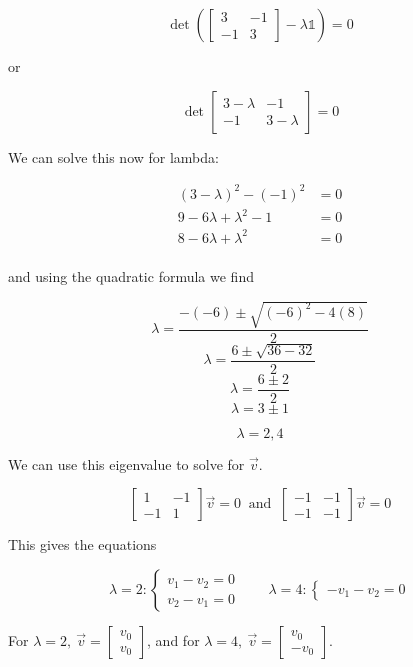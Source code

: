 \documentclass{article}
\begin{document}
$$ \det\left(\begin{bmatrix}
3 	&	-1	\\
-1	&	3	\end{bmatrix} - \lambda\mathbb{1}\right) = 0 $$

or 

$$ \det\begin{bmatrix}
3-\lambda	&	-1	\\
-1	&	3-\lambda	\end{bmatrix} = 0 $$

We can solve this now for lambda:


\begin{align*}
(3-\lambda)^2 - (-1)^2 &= 0 \\
9 - 6\lambda + \lambda^2 - 1 &= 0 \\
8 - 6\lambda + \lambda^2 &= 0 \\
\end{align*}

and using the quadratic formula we find

$$ \lambda = \frac{-(-6) \pm \sqrt{(-6)^2 - 4(8)}}{2} $$
$$ \lambda = \frac{6 \pm \sqrt{36 - 32}}{2} $$
$$ \lambda = \frac{6 \pm 2}{2} $$
$$ \lambda = 3 \pm 1$$

$$\boxed{ \lambda = 2, 4 }$$

We can use this eigenvalue to solve for $\vec{v}$. 

$$\begin{bmatrix}
1 	&	-1	\\
-1	&	1	\end{bmatrix}\vec{v} = 0 \ \text{ and } \ 
\begin{bmatrix}
-1 	&	-1	\\
-1	&	-1	\end{bmatrix}\vec{v} = 0 $$ 

This gives the equations

$$ \lambda = 2: \begin{cases} v_1 - v_2 = 0 \\
                              v_2 - v_1 = 0 \end{cases}
\qquad \lambda = 4: \begin{cases}  -v_1 - v_2 = 0 \end{cases} $$

For $\boxed{ \lambda = 2, \ \vec{v} = \begin{bmatrix}v_0 \\ v_0\end{bmatrix} }$, and for $\boxed{ \lambda = 4, \ \vec{v} = \begin{bmatrix}v_0 \\ -v_0\end{bmatrix} }$.
\end{document}
